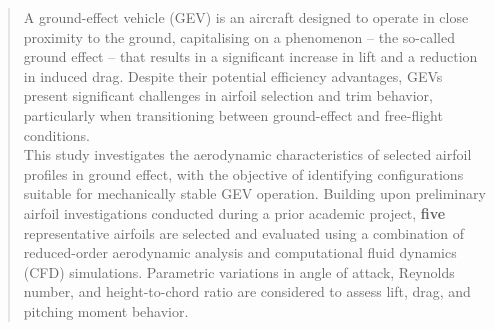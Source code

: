 
\begin{abstract}
\noindent A ground-effect vehicle (GEV) is an aircraft designed to operate in close proximity to the ground, capitalising on a phenomenon -- the so-called ground effect -- that results in a significant increase in lift and a  reduction in induced drag. Despite their potential efficiency advantages, GEVs present significant challenges in airfoil selection and trim behavior, particularly when transitioning between ground-effect and free-flight conditions.\\

\noindent This study investigates the aerodynamic characteristics of selected airfoil profiles in ground effect, with the objective of identifying configurations suitable for mechanically stable GEV operation. Building upon preliminary airfoil investigations conducted during a prior academic project, \textbf{five} representative airfoils are selected and evaluated using a combination of reduced-order aerodynamic analysis and computational fluid dynamics (CFD) simulations. Parametric variations in angle of attack, Reynolds number, and height-to-chord ratio are considered to assess lift, drag, and pitching moment behavior.\\
\end{abstract}

